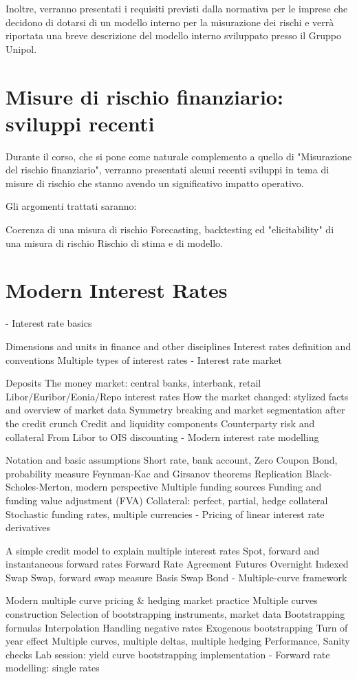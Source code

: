 \documentclass[a4paper,10pt]{article}
\begin{document}
Inoltre, verranno presentati i requisiti previsti dalla normativa per le imprese che decidono di dotarsi di un modello interno per la misurazione dei rischi e verrà riportata una breve descrizione del modello interno sviluppato presso il Gruppo Unipol.


\section{Misure di rischio finanziario: sviluppi recenti}
Durante il corso, che si pone come naturale complemento a quello di "Misurazione del rischio finanziario", verranno presentati alcuni recenti sviluppi in tema di misure di rischio che stanno avendo un significativo impatto operativo.

Gli argomenti trattati saranno:

Coerenza di una misura di rischio
Forecasting, backtesting ed "elicitability" di una misura di rischio
Rischio di stima e di modello.


\section{Modern Interest Rates}
- Interest rate basics

Dimensions and units in finance and other disciplines
Interest rates definition and conventions
Multiple types of interest rates
- Interest rate market

Deposits
The money market: central banks, interbank, retail
Libor/Euribor/Eonia/Repo interest rates
How the market changed: stylized facts and overview of market data
Symmetry breaking and market segmentation after the credit crunch
Credit and liquidity components
Counterparty risk and collateral
From Libor to OIS discounting
- Modern interest rate modelling

Notation and basic assumptions
Short rate, bank account, Zero Coupon Bond, probability measure
Feynman-Kac and Girsanov theorems
Replication
Black-Scholes-Merton, modern perspective
Multiple funding sources
Funding and funding value adjustment (FVA)
Collateral: perfect, partial, hedge collateral
Stochastic funding rates, multiple currencies
- Pricing of linear interest rate derivatives

A simple credit model to explain multiple interest rates
Spot, forward and instantaneous forward rates
Forward Rate Agreement
Futures
Overnight Indexed Swap
Swap, forward swap measure
Basis Swap
Bond
- Multiple-curve framework

Modern multiple curve pricing \& hedging market practice
Multiple curves construction
Selection of bootstrapping instruments, market data
Bootstrapping formulas
Interpolation
Handling negative rates
Exogenous bootstrapping
Turn of year effect
Multiple curves, multiple deltas, multiple hedging
Performance, Sanity checks
Lab session: yield curve bootstrapping implementation
- Forward rate modelling: single rates
\end{document}
